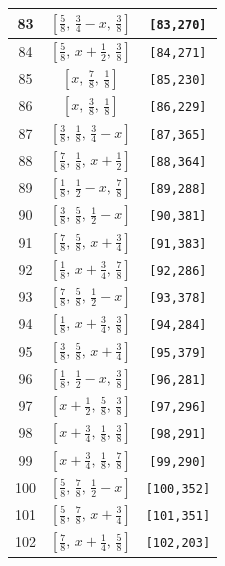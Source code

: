 \documentclass[fleqn,8pt]{jsarticle}
\begin{document}
\begin{longtable}{ccc}
83 & $\left[ \frac{5}{8},\, \frac{3}{4} - x,\, \frac{3}{8} \right]$ & {\tt [83,270]} \\ \hline
84 & $\left[ \frac{5}{8},\, x + \frac{1}{2},\, \frac{3}{8} \right]$ & {\tt [84,271]} \\ \hline
85 & $\left[ x,\, \frac{7}{8},\, \frac{1}{8} \right]$ & {\tt [85,230]} \\ \hline
86 & $\left[ x,\, \frac{3}{8},\, \frac{1}{8} \right]$ & {\tt [86,229]} \\ \hline
87 & $\left[ \frac{3}{8},\, \frac{1}{8},\, \frac{3}{4} - x \right]$ & {\tt [87,365]} \\ \hline
88 & $\left[ \frac{7}{8},\, \frac{1}{8},\, x + \frac{1}{2} \right]$ & {\tt [88,364]} \\ \hline
89 & $\left[ \frac{1}{8},\, \frac{1}{2} - x,\, \frac{7}{8} \right]$ & {\tt [89,288]} \\ \hline
90 & $\left[ \frac{3}{8},\, \frac{5}{8},\, \frac{1}{2} - x \right]$ & {\tt [90,381]} \\ \hline
91 & $\left[ \frac{7}{8},\, \frac{5}{8},\, x + \frac{3}{4} \right]$ & {\tt [91,383]} \\ \hline
92 & $\left[ \frac{1}{8},\, x + \frac{3}{4},\, \frac{7}{8} \right]$ & {\tt [92,286]} \\ \hline
93 & $\left[ \frac{7}{8},\, \frac{5}{8},\, \frac{1}{2} - x \right]$ & {\tt [93,378]} \\ \hline
94 & $\left[ \frac{1}{8},\, x + \frac{3}{4},\, \frac{3}{8} \right]$ & {\tt [94,284]} \\ \hline
95 & $\left[ \frac{3}{8},\, \frac{5}{8},\, x + \frac{3}{4} \right]$ & {\tt [95,379]} \\ \hline
96 & $\left[ \frac{1}{8},\, \frac{1}{2} - x,\, \frac{3}{8} \right]$ & {\tt [96,281]} \\ \hline
97 & $\left[ x + \frac{1}{2},\, \frac{5}{8},\, \frac{3}{8} \right]$ & {\tt [97,296]} \\ \hline
98 & $\left[ x + \frac{3}{4},\, \frac{1}{8},\, \frac{3}{8} \right]$ & {\tt [98,291]} \\ \hline
99 & $\left[ x + \frac{3}{4},\, \frac{1}{8},\, \frac{7}{8} \right]$ & {\tt [99,290]} \\ \hline
100 & $\left[ \frac{5}{8},\, \frac{7}{8},\, \frac{1}{2} - x \right]$ & {\tt [100,352]} \\ \hline
101 & $\left[ \frac{5}{8},\, \frac{7}{8},\, x + \frac{3}{4} \right]$ & {\tt [101,351]} \\ \hline
102 & $\left[ \frac{7}{8},\, x + \frac{1}{4},\, \frac{5}{8} \right]$ & {\tt [102,203]} \\ \hline

\end{longtable}
\end{document}
